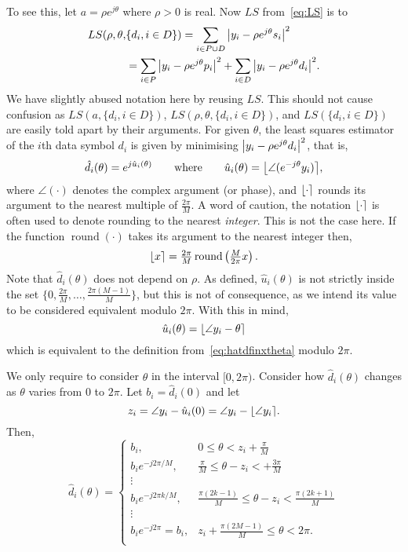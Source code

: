 \documentclass[journal]{IEEEtran}
\begin{document}
To see this, let $a = \rho e^{j\theta}$ where $\rho > 0$ is real.  Now $LS$ from~\eqref{eq:LS} is to
\begin{align}
LS(\rho, \theta, &\{d_i, i \in D\}) = \sum_{i \in P \cup D} {\left\vert  y_i - \rho e^{j\theta} s_i  \right\vert}^2  \nonumber \\
&= \sum_{i \in P} {\left\vert  y_i - \rho e^{j\theta} p_i  \right\vert}^2 + \sum_{i \in D} {\left\vert  y_i - \rho e^{j\theta} d_i  \right\vert}^2. \label{eq:LSallparams}
\end{align}
We have slightly abused notation here by reusing $LS$. This should not cause confusion as $LS(a, \{d_i, i \in D\})$, $LS(\rho, \theta, \{d_i, i \in D\})$, and $LS(\{d_i, i \in D\})$ are easily told apart by their arguments.  For given $\theta$, the least squares estimator of the $i$th data symbol $d_i$ is given by minimising ${\left\vert  y_i - \rho e^{j\theta} d_i  \right\vert}^2$, that is,
\begin{equation}\label{eq:hatdfinxtheta}
\hat{d}_i(\theta) = e^{j\hat{u}_i(\theta)} \qquad \text{where} \qquad \hat{u}_i(\theta) = {\left\lfloor \angle( e^{-j\theta}y_i) \right\rceil},
\end{equation}
where $\angle(\cdot)$ denotes the complex argument (or phase), and ${\left\lfloor \cdot \right\rceil}$ rounds its argument to the nearest multiple of $\frac{2\pi}{M}$.  A word of caution, the notation ${\left\lfloor \cdot \right\rceil}$ is often used to denote rounding to the nearest \emph{integer}.  This is not the case here.  If the function $\operatorname{round}(\cdot)$ takes its argument to the nearest integer then,
\[
{\left\lfloor x \right\rceil} = \tfrac{2\pi}{M}\operatorname{round}\left(\tfrac{M}{2\pi}x\right).
\] 
Note that $\hat{d}_i(\theta)$ does not depend on $\rho$.  As defined, $\hat{u}_i(\theta)$ is not strictly inside the set $\{0, \tfrac{2\pi}{M}, \dots, \tfrac{2\pi(M-1)}{M}\}$, but this is not of consequence, as we intend its value to be considered equivalent modulo $2\pi$.  With this in mind,
\[
\hat{u}_i(\theta) = {\left\lfloor \angle{y_i} - \theta  \right\rceil}
\]
which is equivalent to the definition from~\eqref{eq:hatdfinxtheta} modulo $2\pi$.

We only require to consider $\theta$ in the interval $[0, 2\pi)$.  Consider how $\hat{d}_i(\theta)$ changes as $\theta$ varies from $0$ to $2\pi$.  Let $b_i = \hat{d}_i(0)$ and let 
\[
z_i = \angle{y_i} - \hat{u}_i(0) = \angle{y_i} - {\left\lfloor \angle{y_i} \right\rceil}.
\]
Then,
\begin{equation}\label{eq:uicombos}
\hat{d}_i(\theta) = 
\begin{cases}
b_i, &  0 \leq \theta < z_i + \frac{\pi}{M} \\
b_i e^{-j2\pi/M}, & \frac{\pi}{M} \leq \theta - z_i < + \frac{3\pi}{M} \\ 
\vdots & \\
b_i e^{-j2\pi k /M}, & \frac{\pi(2k - 1)}{M} \leq \theta - z_i < \frac{\pi(2k + 1)}{M}  \\ 
\vdots & \\
b_i e^{-j2\pi} = b_i, &  z_i + \frac{\pi(2M - 1)}{M} \leq \theta < 2\pi. \\
\end{cases}
\end{equation}
\end{document}
